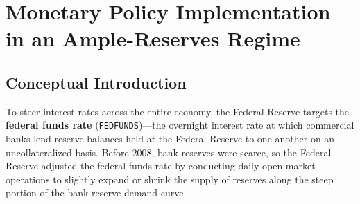 \documentclass[11pt, a4paper]{article}
\begin{document}
\section{Monetary Policy Implementation in an Ample-Reserves Regime}

\subsection*{Conceptual Introduction}
To steer interest rates across the entire economy, the Federal Reserve targets the \textbf{federal funds rate} (\texttt{FEDFUNDS})---the overnight interest rate at which commercial banks lend reserve balances held at the Federal Reserve to one another on an uncollateralized basis. Before 2008, bank reserves were scarce, so the Federal Reserve adjusted the federal funds rate by conducting daily open market operations to slightly expand or shrink the supply of reserves along the steep portion of the bank reserve demand curve.
\end{document}
